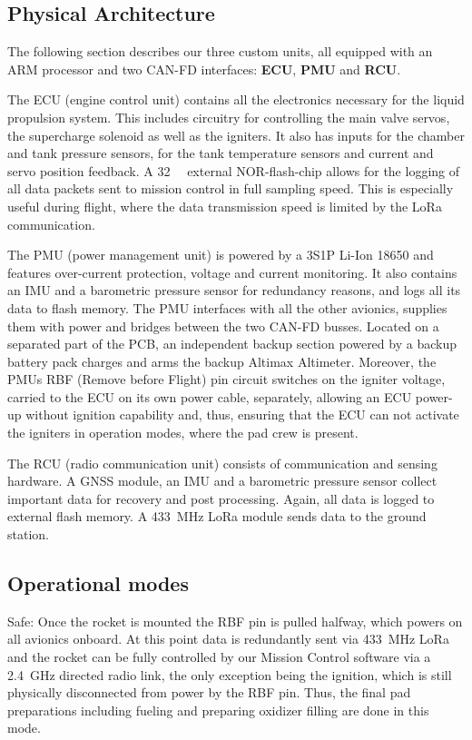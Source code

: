 \subsection{Physical Architecture}
The following section describes our three custom units, all equipped with an ARM processor and two CAN-FD interfaces: \textbf{ECU}, \textbf{PMU} and \textbf{RCU}.

The ECU (engine control unit) contains all the electronics necessary for the liquid propulsion system. This includes circuitry for controlling the main valve servos, the supercharge solenoid as well as the igniters. It also has inputs for the chamber and tank pressure sensors, for the tank temperature sensors and current and servo position feedback. A \SI{32}{\mega\bit} external NOR-flash-chip allows for the logging of all data packets sent to mission control in full sampling speed. This is especially useful during flight, where the data transmission speed is limited by the LoRa communication.

The PMU (power management unit) is powered by a 3S1P Li-Ion 18650 and features over-current protection, voltage and current monitoring. It also contains an IMU and a barometric pressure sensor for redundancy reasons, and logs all its data to flash memory. The PMU interfaces with all the other avionics, supplies them with power and bridges between the two CAN-FD busses. Located on a separated part of the PCB, an independent backup section powered by a backup battery pack charges and arms the backup Altimax Altimeter. Moreover, the PMUs RBF (Remove before Flight) pin circuit switches on the igniter voltage, carried to the ECU on its own power cable, separately, allowing an ECU power-up without ignition capability and, thus, ensuring that the ECU can not activate the igniters in operation modes, where the pad crew is present.

The RCU (radio communication unit) consists of communication and sensing hardware. A GNSS module, an IMU and a barometric pressure sensor collect important data for recovery and post processing. Again, all data is logged to external flash memory. A \SI{433}{\mega\hertz} LoRa module sends data to the ground station.

\subsection{Operational modes}

Safe:
Once the rocket is mounted the RBF pin is pulled halfway, which powers on all avionics onboard. At this point data is redundantly sent via \SI{433}{\mega\hertz} LoRa and the rocket can be fully controlled by our Mission Control software via a \SI{2.4}{\giga\hertz} directed radio link, the only exception being the ignition, which is still physically disconnected from power by the RBF pin. Thus,  the final pad preparations including fueling and preparing oxidizer filling are done in this mode.

